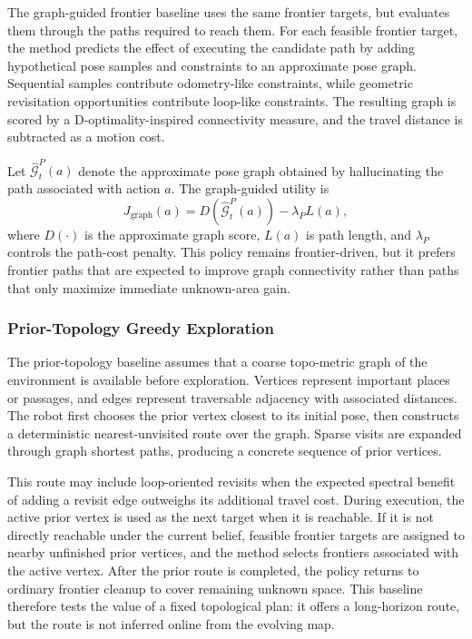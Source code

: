 \documentclass[conference]{IEEEtran}
\begin{document}
The graph-guided frontier baseline uses the same frontier targets, but evaluates them through the paths required to reach them. For each feasible frontier target, the method predicts the effect of executing the candidate path by adding hypothetical pose samples and constraints to an approximate pose graph. Sequential samples contribute odometry-like constraints, while geometric revisitation opportunities contribute loop-like constraints. The resulting graph is scored by a D-optimality-inspired connectivity measure, and the travel distance is subtracted as a motion cost.

Let $\widehat{\mathcal{G}}^P_t(a)$ denote the approximate pose graph obtained by hallucinating the path associated with action $a$. The graph-guided utility is
\begin{equation}
J_{\mathrm{graph}}(a)
=
D\left(\widehat{\mathcal{G}}^P_t(a)\right)
-
\lambda_P L(a),
\end{equation}
where $D(\cdot)$ is the approximate graph score, $L(a)$ is path length, and $\lambda_P$ controls the path-cost penalty. This policy remains frontier-driven, but it prefers frontier paths that are expected to improve graph connectivity rather than paths that only maximize immediate unknown-area gain.

\subsubsection{Prior-Topology Greedy Exploration}

The prior-topology baseline assumes that a coarse topo-metric graph of the environment is available before exploration. Vertices represent important places or passages, and edges represent traversable adjacency with associated distances. The robot first chooses the prior vertex closest to its initial pose, then constructs a deterministic nearest-unvisited route over the graph. Sparse visits are expanded through graph shortest paths, producing a concrete sequence of prior vertices.

This route may include loop-oriented revisits when the expected spectral benefit of adding a revisit edge outweighs its additional travel cost. During execution, the active prior vertex is used as the next target when it is reachable. If it is not directly reachable under the current belief, feasible frontier targets are assigned to nearby unfinished prior vertices, and the method selects frontiers associated with the active vertex. After the prior route is completed, the policy returns to ordinary frontier cleanup to cover remaining unknown space. This baseline therefore tests the value of a fixed topological plan: it offers a long-horizon route, but the route is not inferred online from the evolving map.
\end{document}
